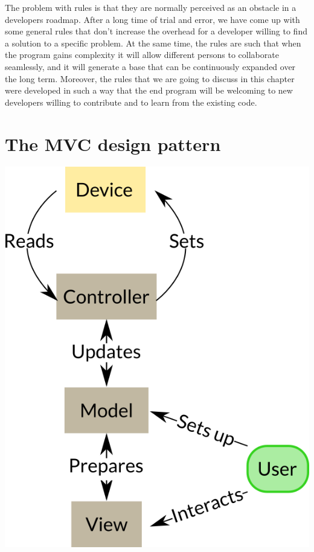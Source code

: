 The problem with rules is that they are normally perceived as an obstacle in a developers roadmap. After a long time of trial and error, we have come up with some general rules that don't increase the overhead for a developer willing to find a solution to a specific problem. At the same time, the rules are such that when the program gains complexity it will allow different persons to collaborate seamlessly, and it will generate a base that can be continuously expanded over the long term. Moreover, the rules that we are going to discuss in this chapter were developed in such a way that the end program will be welcoming to new developers willing to contribute and to learn from the existing code. 

\section{The MVC design pattern}\label{the-mvc-designpattern}
\begin{center}
\includegraphics{images/Chapter_04/MVCs.png}
\end{center}

